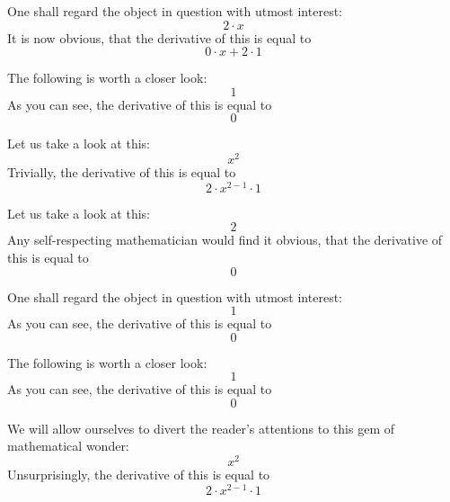 \documentclass{article}
\begin{document}
One shall regard the object in question with utmost interest:
\begin{equation}
2 \cdot x 
\end{equation}
It is now obvious, that the derivative of this is equal to
\begin{equation}
0 \cdot x + 2 \cdot 1 
\end{equation}

The following is worth a closer look:
\begin{equation}
1 
\end{equation}
As you can see, the derivative of this is equal to
\begin{equation}
0 
\end{equation}

Let us take a look at this:
\begin{equation}
x ^{2 } 
\end{equation}
Trivially, the derivative of this is equal to
\begin{equation}
2 \cdot x ^{2 - 1 } \cdot 1 
\end{equation}

Let us take a look at this:
\begin{equation}
2 
\end{equation}
Any self-respecting mathematician would find it obvious, that the derivative of this is equal to
\begin{equation}
0 
\end{equation}

One shall regard the object in question with utmost interest:
\begin{equation}
1 
\end{equation}
As you can see, the derivative of this is equal to
\begin{equation}
0 
\end{equation}

The following is worth a closer look:
\begin{equation}
1 
\end{equation}
As you can see, the derivative of this is equal to
\begin{equation}
0 
\end{equation}

We will allow ourselves to divert the reader's attentions to this gem of mathematical wonder:
\begin{equation}
x ^{2 } 
\end{equation}
Unsurprisingly, the derivative of this is equal to
\begin{equation}
2 \cdot x ^{2 - 1 } \cdot 1 
\end{equation}
\end{document}
